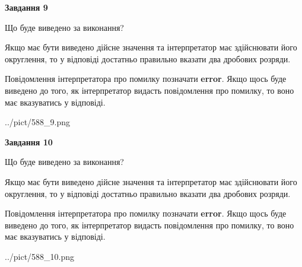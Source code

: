 \documentclass[12pt, ukrainian]{article}
\begin{document}
{\begin {Large}
{\begin {center}\textbf{Завдання 9}\end {center}}\par
Що буде виведено за виконання? \par

Якщо має бути виведено дійсне значення та інтерпретатор має здійснювати його округлення, 
то у відповіді достатньо правильно вказати два дробових розряди.

Повідомлення інтерпретатора про помилку позначати \textbf{error}.
Якщо щось буде виведено до того, як інтерпретатор видасть повідомлення про помилку, 
то воно має вказуватись у відповіді. \par

\begin{center}
	{../pict/588_9.png}
\end{center}
\newpage

{\begin {center}\textbf{Завдання 10}\end {center}}\par
Що буде виведено за виконання? \par

Якщо має бути виведено дійсне значення та інтерпретатор має здійснювати його округлення, 
то у відповіді достатньо правильно вказати два дробових розряди.

Повідомлення інтерпретатора про помилку позначати \textbf{error}.
Якщо щось буде виведено до того, як інтерпретатор видасть повідомлення про помилку, 
то воно має вказуватись у відповіді. \par

\begin{center}
	{../pict/588_10.png}
\end{center}
\newpage

\end {Large}}
\end{document}
